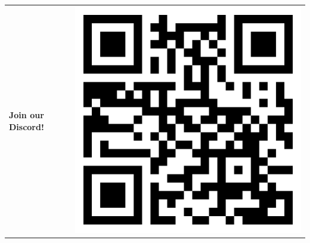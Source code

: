 \documentclass[12pt]{article}
\begin{document}
\vspace{0.1mm}
\begin{center}
	\begin{tabular}{m{15em} m{1mm} m{5em}}
		\Large {\textbf{Join our Discord!}} & &
		\includegraphics[scale=0.07]{discord.png}
	\end{tabular}
\end{center}
\end{document}
